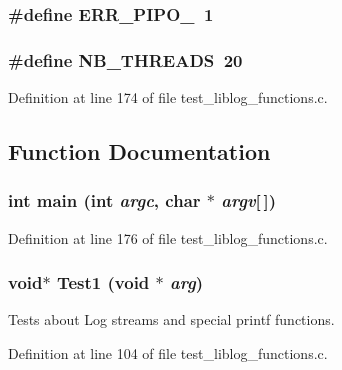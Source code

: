 \subsubsection[{ERR\_\-PIPO\_\-2}]{\setlength{\rightskip}{0pt plus 5cm}\#define ERR\_\-PIPO\_~1}\label{test__liblog__functions_8c_cc1fe662644cc45414464a14cb8c7ddb}


\subsubsection[{NB\_\-THREADS}]{\setlength{\rightskip}{0pt plus 5cm}\#define NB\_\-THREADS~20}\label{test__liblog__functions_8c_93efd606e54bc5bfcc8fd6a0709b5487}




Definition at line 174 of file test\_\-liblog\_\-functions.c.

\subsection{Function Documentation}
\subsubsection[{main}]{\setlength{\rightskip}{0pt plus 5cm}int main (int {\em argc}, \/  char $\ast$ {\em argv}[$\,$])}\label{test__liblog__functions_8c_0ddf1224851353fc92bfbff6f499fa97}




Definition at line 176 of file test\_\-liblog\_\-functions.c.
\subsubsection[{Test1}]{\setlength{\rightskip}{0pt plus 5cm}void$\ast$ Test1 (void $\ast$ {\em arg})}\label{test__liblog__functions_8c_fc27d60fbf5ea1420a0bcbbea8231b38}


Tests about Log streams and special printf functions. 

Definition at line 104 of file test\_\-liblog\_\-functions.c.